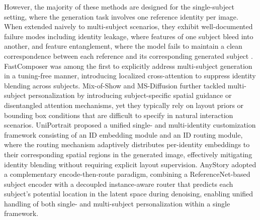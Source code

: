 \documentclass{article}
\begin{document}
However, the majority of these methods are designed for the single-subject setting, where the generation task involves one reference identity per image. When extended naively to multi-subject scenarios, they exhibit well-documented failure modes including identity leakage, where features of one subject bleed into another, and feature entanglement, where the model fails to maintain a clean correspondence between each reference and its corresponding generated subject \cite{xiao2023fastcomposer, wang2024ms, she2025mosaic}. FastComposer \cite{xiao2023fastcomposer} was among the first to explicitly address multi-subject generation in a tuning-free manner, introducing localized cross-attention to suppress identity blending across subjects. Mix-of-Show \cite{gu2024mix} and MS-Diffusion \cite{wang2024ms} further tackled multi-subject personalization by introducing subject-specific spatial guidance or disentangled attention mechanisms, yet they typically rely on layout priors or bounding box conditions that are difficult to specify in natural interaction scenarios. UniPortrait \cite{he2024uniportrait} proposed a unified single- and multi-identity customization framework consisting of an ID embedding module and an ID routing module, where the routing mechanism adaptively distributes per-identity embeddings to their corresponding spatial regions in the generated image, effectively mitigating identity blending without requiring explicit layout supervision. AnyStory \cite{he2025anystory} adopted a complementary encode-then-route paradigm, combining a ReferenceNet-based subject encoder with a decoupled instance-aware router that predicts each subject's potential location in the latent space during denoising, enabling unified handling of both single- and multi-subject personalization within a single framework.
\end{document}

